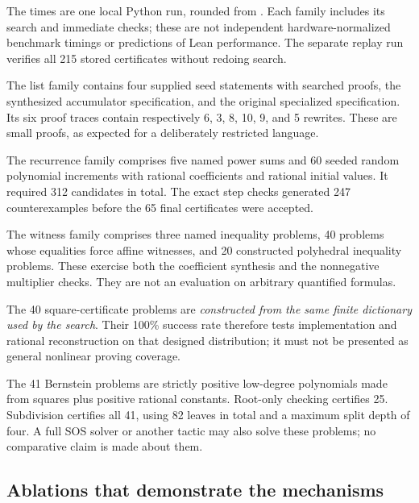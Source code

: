 The times are one local Python run, rounded from
. Each family includes its search and immediate
checks; these are not independent hardware-normalized benchmark timings or
predictions of Lean performance. The separate replay run verifies all 215
stored certificates without redoing search.

The list family contains four supplied seed statements with searched proofs,
the synthesized accumulator specification, and the original specialized
specification. Its six proof traces contain respectively 6, 3, 8, 10, 9, and
5 rewrites. These are small proofs, as expected for a deliberately restricted
language.

The recurrence family comprises five named power sums and 60 seeded random
polynomial increments with rational coefficients and rational initial values.
It required 312 candidates in total. The exact step checks generated 247
counterexamples before the 65 final certificates were accepted.

The witness family comprises three named inequality problems, 40 problems
whose equalities force affine witnesses, and 20 constructed polyhedral
inequality problems. These exercise both the coefficient synthesis and the
nonnegative multiplier checks. They are not an evaluation on arbitrary
quantified formulas.

The 40 square-certificate problems are \emph{constructed from the same finite
dictionary used by the search}. Their 100\% success rate therefore tests
implementation and rational reconstruction on that designed distribution;
it must not be presented as general nonlinear proving coverage.

The 41 Bernstein problems are strictly positive low-degree polynomials made
from squares plus positive rational constants. Root-only checking certifies
25. Subdivision certifies all 41, using 82 leaves in total and a maximum split
depth of four. A full SOS solver or another tactic may also solve these
problems; no comparative claim is made about them.

\subsection{Ablations that demonstrate the mechanisms}

